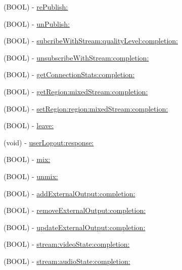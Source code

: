 \begin{DoxyCompactItemize}
\item 
(B\+O\+OL) -\/ \hyperlink{interface_c_c_streamer_basic_ada5f0d8268f6a10829e0784ded531b78}{re\+Publish\+:}
\item 
(B\+O\+OL) -\/ \hyperlink{interface_c_c_streamer_basic_a9c3e78ba904db41009fe422519f91e54}{un\+Publish\+:}
\item 
(B\+O\+OL) -\/ \hyperlink{interface_c_c_streamer_basic_a10f88cc1192212c402fbf441e58f0e21}{subcribe\+With\+Stream\+:quality\+Level\+:completion\+:}
\item 
(B\+O\+OL) -\/ \hyperlink{interface_c_c_streamer_basic_a84d647ce0824c172ae3a9ee95676ccb6}{unsubscribe\+With\+Stream\+:completion\+:}
\item 
(B\+O\+OL) -\/ \hyperlink{interface_c_c_streamer_basic_a3eb486f4cd40fa8e532c05cfa2baf197}{get\+Connection\+Stats\+:completion\+:}
\item 
(B\+O\+OL) -\/ \hyperlink{interface_c_c_streamer_basic_a56e16b52ed8d9e0c4c497187a09fbd8d}{get\+Region\+:mixed\+Stream\+:completion\+:}
\item 
(B\+O\+OL) -\/ \hyperlink{interface_c_c_streamer_basic_a1f2409d6635e84569dbefe576e7aca1e}{set\+Region\+:region\+:mixed\+Stream\+:completion\+:}
\item 
(B\+O\+OL) -\/ \hyperlink{interface_c_c_streamer_basic_ab78edee32e3ccd7b1e6d8a46b517dc38}{leave\+:}
\item 
(void) -\/ \hyperlink{interface_c_c_streamer_basic_a55bf0d02dbd791b32f53a0ea55680f04}{user\+Logout\+:response\+:}
\item 
(B\+O\+OL) -\/ \hyperlink{interface_c_c_streamer_basic_aa665ff886f80c70e60419839c1f05c38}{mix\+:}
\item 
(B\+O\+OL) -\/ \hyperlink{interface_c_c_streamer_basic_abcce3e26c170dbec38736c07d35df8d6}{unmix\+:}
\item 
(B\+O\+OL) -\/ \hyperlink{interface_c_c_streamer_basic_a1030eaa7f4c49132b426ab4f20385ec6}{add\+External\+Output\+:completion\+:}
\item 
(B\+O\+OL) -\/ \hyperlink{interface_c_c_streamer_basic_a1180df52bef6dacd8a85009cb4c84185}{remove\+External\+Output\+:completion\+:}
\item 
(B\+O\+OL) -\/ \hyperlink{interface_c_c_streamer_basic_af73255187458b1385508cef508131458}{update\+External\+Output\+:completion\+:}
\item 
(B\+O\+OL) -\/ \hyperlink{interface_c_c_streamer_basic_ad36a7eef2a31f2e909d3159e6ba607ce}{stream\+:video\+State\+:completion\+:}
\item 
(B\+O\+OL) -\/ \hyperlink{interface_c_c_streamer_basic_a8ccee83dc711f33ce27abb63140efab2}{stream\+:audio\+State\+:completion\+:}

\end{DoxyCompactItemize}
